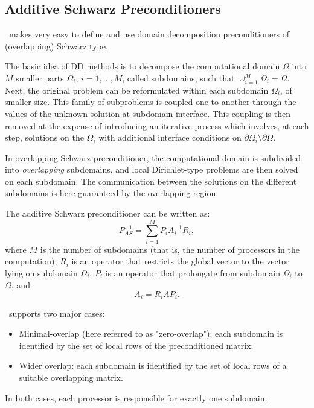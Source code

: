 \subsection{Additive Schwarz Preconditioners}
\label{sec:additive}

\ifpack\ makes very easy to define and use domain decomposition
preconditioners of (overlapping) Schwarz type.

The basic idea of DD methods is to decompose the
computational domain $\Omega$ into $M$ smaller parts $\Omega_i$,
$i=1,\ldots,M$, called subdomains, such that $\cup_{i=1}^{M}
\overline{\Omega_i} = \overline{\Omega}$.  Next, the original problem can
be reformulated within each subdomain $\Omega_i$, of smaller size. This
family of subproblems is coupled one to another through the values of the
unknown solution at subdomain interface. This coupling is then removed at
the expense of introducing an iterative process which involves, at each
step, solutions on the $\Omega_i$ with additional interface conditions on
$\partial \Omega_i \setminus \partial \Omega$.

In overlapping Schwarz preconditioner, the computational domain is
subdivided into {\sl overlapping} subdomains, and local Dirichlet-type
problems are then solved on each subdomain.  The communication between the
solutions on the different subdomains is here guaranteed by the overlapping
region. 

The additive Schwarz preconditioner can be written as:
\begin{equation}
\label{eq:as}
P_{AS}^{-1} = \sum_{i=1}^M P_i A_i^{-1} R_i ,
\end{equation}
where $M$ is the number of subdomains (that is, the number of processors in
the computation), $R_i$ is an operator that restricts the global 
vector to the vector lying on subdomain $\Omega_i$, $P_i$ is an operator that
prolongate from subdomain $\Omega_i$ to $\Omega$, and
\begin{equation}
\label{eq:Ai}
A_i = R_i A P_i.
\end{equation}

\ifpack\ supports two major cases:
\begin{itemize}
\item Minimal-overlap (here referred to as "zero-overlap"): each subdomain
is identified by the set of local rows of the preconditioned matrix;
\item Wider overlap: each subdomain is identified by the set of local rows
of a suitable overlapping matrix.
\end{itemize}
In both cases, each processor is responsible for exactly one subdomain.

